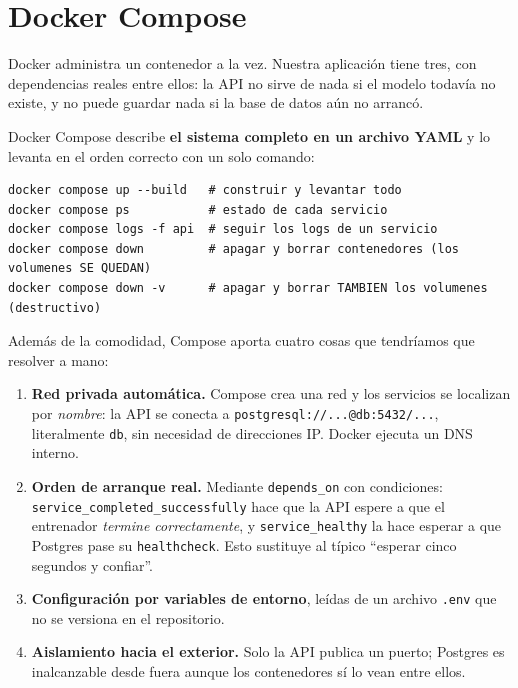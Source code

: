 \documentclass[12pt,a4paper]{article}
\begin{document}
\section{Docker Compose}

Docker administra un contenedor a la vez. Nuestra aplicaci\'on tiene tres, con dependencias
reales entre ellos: la API no sirve de nada si el modelo todav\'ia no existe, y no puede guardar
nada si la base de datos a\'un no arranc\'o.

Docker Compose describe \textbf{el sistema completo en un archivo YAML} y lo levanta en el orden
correcto con un solo comando:

\begin{verbatim}
docker compose up --build   # construir y levantar todo
docker compose ps           # estado de cada servicio
docker compose logs -f api  # seguir los logs de un servicio
docker compose down         # apagar y borrar contenedores (los volumenes SE QUEDAN)
docker compose down -v      # apagar y borrar TAMBIEN los volumenes (destructivo)
\end{verbatim}

Adem\'as de la comodidad, Compose aporta cuatro cosas que tendr\'iamos que resolver a mano:

\begin{enumerate}
\item \textbf{Red privada autom\'atica.} Compose crea una red y los servicios se localizan por
\emph{nombre}: la API se conecta a \texttt{postgresql://...@db:5432/...}, literalmente
\texttt{db}, sin necesidad de direcciones IP. Docker ejecuta un DNS interno.

\item \textbf{Orden de arranque real.} Mediante \texttt{depends\_on} con condiciones:
\texttt{service\_completed\_successfully} hace que la API espere a que el entrenador
\emph{termine correctamente}, y \texttt{service\_healthy} la hace esperar a que Postgres pase su
\texttt{healthcheck}. Esto sustituye al t\'ipico ``esperar cinco segundos y confiar''.

\item \textbf{Configuraci\'on por variables de entorno}, le\'idas de un archivo \texttt{.env} que
no se versiona en el repositorio.

\item \textbf{Aislamiento hacia el exterior.} Solo la API publica un puerto; Postgres es
inalcanzable desde fuera aunque los contenedores s\'i lo vean entre ellos.
\end{enumerate}
\end{document}

